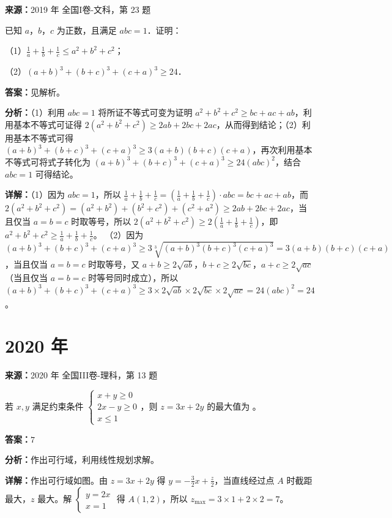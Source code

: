 \begin{question}[points=10]
\textbf{来源：}2019 年 全国I卷-文科，第 23 题\par
已知 $a$，$b$，$c$ 为正数，且满足 $abc=1$．证明：

（1）$\frac{1}{a} + \frac{1}{b} + \frac{1}{c} \le a^2 + b^2 + c^2$；

（2）$(a+b)^3 + (b+c)^3 + (c+a)^3 \ge 24$．
\begin{solution}
\textbf{答案：}见解析。

\textbf{分析：}（1）利用 $abc=1$ 将所证不等式可变为证明 $a^2+b^2+c^2 \ge bc+ac+ab$，利用基本不等式可证得 $2(a^2+b^2+c^2) \ge 2ab+2bc+2ac$，从而得到结论；（2）利用基本不等式可得 $(a+b)^3+(b+c)^3+(c+a)^3 \ge 3(a+b)(b+c)(c+a)$，再次利用基本不等式可将式子转化为 $(a+b)^3+(b+c)^3+(c+a)^3 \ge 24(abc)^2$，结合 $abc=1$ 可得结论。

\textbf{详解：}（1）因为 $abc=1$，所以 $\frac{1}{a}+\frac{1}{b}+\frac{1}{c} = (\frac{1}{a}+\frac{1}{b}+\frac{1}{c})\cdot abc = bc+ac+ab$，而 $2(a^2+b^2+c^2) = (a^2+b^2)+(b^2+c^2)+(c^2+a^2) \ge 2ab+2bc+2ac$，当且仅当 $a=b=c$ 时取等号，所以 $2(a^2+b^2+c^2) \ge 2(\frac{1}{a}+\frac{1}{b}+\frac{1}{c})$，即 $a^2+b^2+c^2 \ge \frac{1}{a}+\frac{1}{b}+\frac{1}{c}$。
（2）因为 $(a+b)^3+(b+c)^3+(c+a)^3 \ge 3\sqrt[3]{(a+b)^3(b+c)^3(c+a)^3} = 3(a+b)(b+c)(c+a)$，当且仅当 $a=b=c$ 时取等号，又 $a+b \ge 2\sqrt{ab}$，$b+c \ge 2\sqrt{bc}$，$a+c \ge 2\sqrt{ac}$（当且仅当 $a=b=c$ 时等号同时成立），所以 $(a+b)^3+(b+c)^3+(c+a)^3 \ge 3 \times 2\sqrt{ab} \times 2\sqrt{bc} \times 2\sqrt{ac} = 24(abc)^2 = 24$。
\end{solution}
\end{question}

\section*{2020 年}

\begin{question}[points=5]
\textbf{来源：}2020 年 全国III卷-理科，第 13 题\par
若 $x,y$ 满足约束条件 $\begin{cases} x+y\ge0 \\ 2x-y\ge0 \\ x\le1 \end{cases}$，则 $z=3x+2y$ 的最大值为 。
\fillin[{$7$}]
\begin{solution}
\textbf{答案：}$7$

\textbf{分析：}作出可行域，利用线性规划求解。

\textbf{详解：}作出可行域如图。由 $z=3x+2y$ 得 $y=-\frac32x+\frac{z}{2}$，当直线经过点 $A$ 时截距最大，$z$ 最大。解 $\begin{cases} y=2x \\ x=1 \end{cases}$ 得 $A(1,2)$，所以 $z_{\max}=3\times1+2\times2=7$。
\end{solution}
\end{question}

